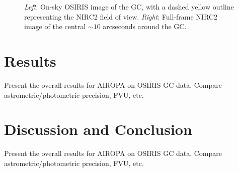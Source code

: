 \documentclass[]{spie}  %
\begin{document}
\begin{figure}[!h]
  \hspace{-20mm}
  \caption{\footnotesize \textit{Left}: On-sky OSIRIS image of the GC, with a dashed yellow outline representing the NIRC2 field of view. \textit{Right}: Full-frame NIRC2 image of the central ${\sim}10$ arcseconds around the GC.} \label{fig:gc_osiris_nirc2}
\end{figure}

\section{Results}\label{sec:results}
Present the overall results for AIROPA on OSIRIS GC data. Compare astrometric/photometric precision, FVU, etc.

\section{Discussion and Conclusion}\label{sec:conclusion}
Present the overall results for AIROPA on OSIRIS GC data. Compare astrometric/photometric precision, FVU, etc.


\listoffigures
\end{document}
